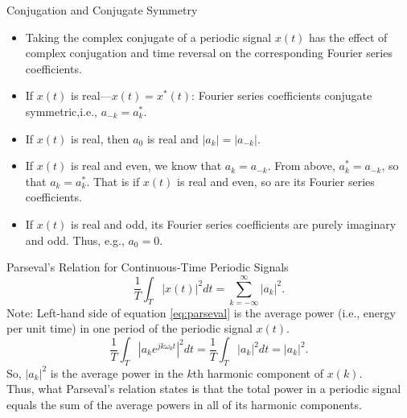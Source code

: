 \begin{frame}[plain]{Conjugation and Conjugate Symmetry}
    {

        \begin{itemize}[<+->]
          \item Taking the complex conjugate of a periodic signal $x(t)$ has the effect of complex conjugation and \alert{time reversal} on the corresponding Fourier series coefficients.
          \item If $x(t)$ is real---$x(t) = x^\ast(t)$: Fourier series coefficients conjugate symmetric,i.e., $a_{-k} = a^\ast_k$.
          \item If $x(t)$ is real, then $a_0$ is real and $|a_k| = |a_{-k}|$.
          \item If $x(t)$ is real and even, we know that $a_k = a_{-k}$. From above, $a^\ast_k = a_{-k}$, so that $a_{k} = a^\ast_k$. That is if $x(t)$ is real and even, so are its Fourier series coefficients.
          \item If $x(t)$ is real and odd, its Fourier series coefficients are purely imaginary and odd. Thus, e.g., $a_0 = 0$.%
        \end{itemize}
    }
\end{frame}


\begin{frame}{Parseval's Relation for Continuous-Time Periodic Signals}
    \begin{equation}\label{eq:parseval}
        \frac{1}{T}\int_{T} |x(t)|^2dt = \sum_{k=-\infty}^{\infty}|a_k|^2.
    \end{equation}
    \pause
    {
        \noindent Note: Left-hand side of equation \ref{eq:parseval} is the average power (i.e., energy per unit time) in one period of the periodic signal $x(t)$.\\

        \begin{equation}
            \frac{1}{T}\int_{T} \left| a_k e^{jk\omega_0 t}\right|^2dt = \frac{1}{T}\int_{T} \left| a_k \right|^2dt = |a_k|^2.
        \end{equation}
        So, $|a_k|^2$ is the average power in the $k$th harmonic component of $x(k)$.\\
        Thus, what Parseval's relation states is that the total power in a periodic signal equals the sum of the average powers in all of its harmonic components.
    }
\end{frame}

